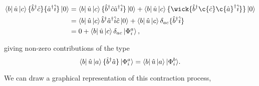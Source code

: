 \documentclass[11pt]{article}
\begin{document}
	\begin{equation}
		\begin{aligned}
			\bra{b} \hat{u} \ket{c} \{ \hat{b}^\dagger \hat{c} \} \{ \hat{a}^\dagger \hat{i} \} \ket{0} 
				&= \bra{b} \hat{u} \ket{c} \{ \hat{b}^\dagger \hat{c} \hat{a}^\dagger \hat{i} \} \ket{0}
				+	   \bra{b} \hat{u} \ket{c} \{\wick{  \hat{b}^\dagger  \c{\hat{c}}  \c{\hat{a}}^\dagger \hat{i} } \} \ket{0}\\
				&= \bra{b} \hat{u} \ket{c} \hat{b}^\dagger\hat{a}^\dagger\hat{i}\hat{c}\ket{0}
				+	  \bra{b} \hat{u} \ket{c} \delta_{ac}\{\hat{b}^\dagger \hat{i} \} \\
				&= 0 + \bra{b} \hat{u} \ket{c} \delta_{ac}\ket{\Phi_i^a},
		\end{aligned}
	\end{equation}
	
	giving non-zero contributions of the type
	\begin{equation}
		\bra{b} \hat{u} \ket{a} \{ \hat{b}^\dagger \hat{a} \} \ket{\Phi_i^a} 
			= \bra{b} \hat{u} \ket{a} \lvert \Phi_i^b \rangle.
	\end{equation}
	
	We can draw a graphical representation of this contraction process,
	
\end{document}
